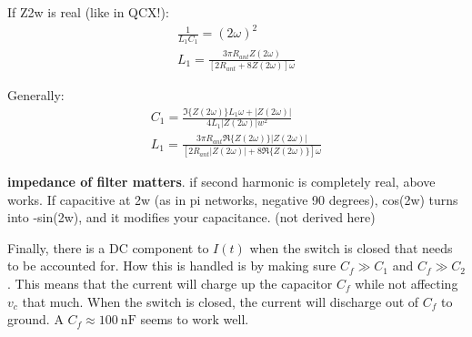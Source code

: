 \documentclass[10pt,letterpaper]{article}
\begin{document}
\begin{enumerate}
If Z2w is real (like in QCX!):
\begin{align*}
\frac{1}{L_1C_1}=(2\omega)^2\\
L_1=\frac{3 \pi R_{ant} Z(2\omega) }{[2R_{ant}+8Z(2\omega)]\omega}
\end{align*}

Generally:
\begin{align*}
C_1 = \frac{\Im\{Z(2\omega)\}L_1\omega+|Z(2\omega)|}{4L_1 |Z(2\omega)|w^2}\\
L_1=\frac{3 \pi R_{ant} \Re\{Z(2\omega)\} |Z(2\omega)| }{[2R_{ant}|Z(2\omega)|+8\Re\{Z(2\omega)\}]\omega}
\end{align*}

\textbf{impedance of filter matters}. if second harmonic is completely real, above works. If capacitive at 2w (as in pi networks, negative 90 degrees), cos(2w) turns into -sin(2w), and it modifies your capacitance. (not derived here)

Finally, there is a DC component to $I(t)$ when the switch is closed that needs to be accounted for. How this is handled is by making sure $C_f \gg C_1$ and $C_f \gg C_2$. This means that the current will charge up the capacitor $C_f$ while not affecting $v_c$ that much. When the switch is closed, the current will discharge out of $C_f$ to ground. A $C_f\approx \SI{100}{\nano\farad}$ seems to work well.



\end{enumerate}
\end{document}
